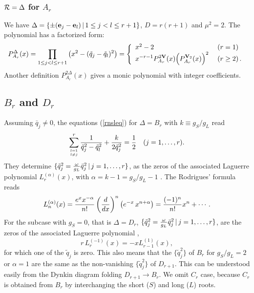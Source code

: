 \documentclass[a4paper,12pt]{article}
\newcommand{\vTm}{\vphantom{\mbox{\oneeight I}}}
\begin{document}
\subsubsection{${\cal R}=\Delta$ for $A_r$}

We have $\Delta=\{\pm({\bf e}_j-{\bf e}_l)\,|\,1\leq j<l\leq r+1\}$,
$D=r(r+1)$ and $\mu^2=2$.
The polynomial has a factorized form:
\begin{equation}
   P_{A_r}^{\Delta}(x)=
   \prod_{1\leq j<l\leq r+1}\left(\vTm x^2-(\tilde{q}_j-\tilde{q}_l)^2\right)
   =\left\{\begin{array}{ll}
    x^2-2&\;(r=1)\\
    {\displaystyle
    x^{-r-1}P_{A_r}^{2{\bf V}}(x)\Bigl(P_{A_r}^{{\bf V}_2}(x)\Bigr)^2}
    &\;(r\geq 2)\,.
   \end{array}\right.
\end{equation}
Another definition $P_{A_r}^{2\Delta}(x)$ gives a monic polynomial with 
integer coefficients.

\subsection{$B_r$ and $D_r$}

Assuming $\bar{q}_j\ne0$, the equations (\ref{rnsleq}) for $\Delta=B_r$
with $k\equiv g_S/g_L$ read
\begin{equation}
   \sum_{l=1\atop l\ne j}^{r}{1\over{\tilde{q}_j^2-\tilde{q}_l^2}}
   +{k\over{2\tilde{q}_j^2}}={1\over{2}}\quad(j=1,\ldots,r).
   \label{lagroots}
\end{equation}
They determine $\{\tilde{q}_j^2={\omega\over g_L}\bar{q}_j^2\,|\,
j=1,\ldots,r\}$, as the zeros of the associated Laguerre polynomial
$L_{r}^{(\alpha)}(x)$, with $\alpha=k-1=g_S/g_L-1$ \cite{cs,szego,OP1}.
The Rodrigues' formula reads
\begin{equation}
   L_n^{(\alpha)}(x)={e^x x^{-\alpha}\over{n!}}\left({d\over{dx}}\right)^n
   \left(e^{-x}\,x^{n+\alpha}\right)=\frac{(-1)^n}{n!}x^n+\cdots.
\end{equation}
For the subcase with $g_S=0$, that is $\Delta=D_r$, $\{\tilde{q}_j^2=
{\omega\over g_L}\bar{q}_j^2\,|\,j=1,\ldots,r\}$, are the zeros of the
associated Laguerre  polynomial \cite{szego,OP1},
\begin{equation}
   r\,L_{r}^{(-1)}(x)=-xL_{r-1}^{(1)}(x),
   \label{lagiden}
\end{equation}
for which one of the $\tilde{q}_j$ is zero.
This also means that the $\{\tilde{q}_j^2\}$ of $B_r$ for $g_S/g_L=2$ or
$\alpha=1$ are the same as the non-vanishing $\{\tilde{q}_j^2\}$ of $D_{r+1}$.
This can be understood easily from the Dynkin diagram folding $D_{r+1}\to B_r$.
We omit $C_r$ case, because $C_r$ is obtained from $B_r$ by interchanging the
short ($S$) and long ($L$) roots.
\end{document}
